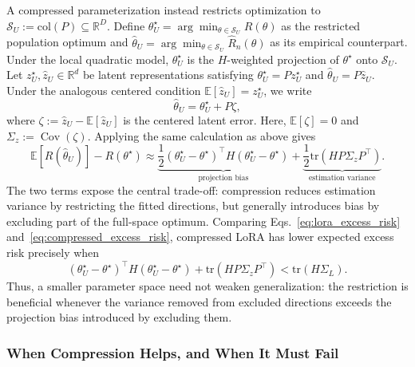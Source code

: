 A compressed parameterization instead restricts optimization to
$\mathcal{S}_U:=\mathrm{col}(P)\subseteq\mathbb{R}^D$.
Define
$\theta^\star_U=\arg\min_{\theta\in\mathcal{S}_U}R(\theta)$
as the restricted population optimum and
$\hat{\theta}_U=\arg\min_{\theta\in\mathcal{S}_U}\widehat R_n(\theta)$
as its empirical counterpart.
Under the local quadratic model, $\theta^\star_U$ is the $H$-weighted projection of $\theta^\star$ onto $\mathcal{S}_U$.
Let $z^\star_U,\hat{z}_U\in\mathbb{R}^d$ be latent representations satisfying
$\theta^\star_U=Pz^\star_U$ and $\hat{\theta}_U=P\hat{z}_U$.
Under the analogous centered condition $\mathbb{E}[\hat{z}_U]=z^\star_U$, we write
\begin{equation}
\hat{\theta}_U=\theta^\star_U+P\zeta,
\label{eq:compressed_centered_decomp}
\end{equation}
where $\zeta:=\hat{z}_U-\mathbb{E}[\hat{z}_U]$ is the centered latent error.
Here, $\mathbb{E}[\zeta]=0$ and $\Sigma_z:=\operatorname{Cov}(\zeta)$.
Applying the same calculation as above gives
\begin{equation}
\mathbb{E}[R(\hat{\theta}_{U})]-R(\theta^\star)
\approx
\underbrace{
\frac{1}{2}
(\theta^\star_U-\theta^\star)^\top
H
(\theta^\star_U-\theta^\star)
}_{\text{projection bias}}
+
\underbrace{
\frac{1}{2}
\mathrm{tr}(HP\Sigma_zP^\top)
}_{\text{estimation variance}} .
\label{eq:compressed_excess_risk}
\end{equation}
The two terms expose the central trade-off: compression reduces estimation variance by restricting the fitted directions, but generally introduces bias by excluding part of the full-space optimum.
Comparing Eqs.~\eqref{eq:lora_excess_risk} and~\eqref{eq:compressed_excess_risk}, compressed LoRA has lower expected excess risk precisely when
\begin{equation}
(\theta^\star_U-\theta^\star)^\top
H
(\theta^\star_U-\theta^\star)
+
\mathrm{tr}(HP\Sigma_zP^\top)
<
\mathrm{tr}(H\Sigma_L).
\label{eq:compression_condition}
\end{equation}
Thus, a smaller parameter space need not weaken generalization: the restriction is beneficial whenever the variance removed from excluded directions exceeds the projection bias introduced by excluding them.

\subsubsection{When Compression Helps, and When It Must Fail}
\label{sec:when_fails}

